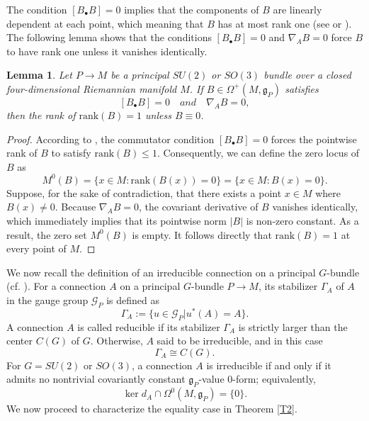 \documentclass[12pt, twoside]{article}
\newtheorem{lemma}[theorem]{Lemma}
\theoremstyle{definition}
\numberwithin{equation}{section}
\def\Om{\Omega}
\def\na {\nabla}
\def\Ga{\Gamma}
\begin{document}
The condition $[B_{\bullet}B]=0$ implies that the components of $B$ are linearly dependent at each point, 
which meaning that $B$ has at most rank one (see \cite[Lemma 3.5]{Hua24} or \cite[Lemma 1.6]{Tan17}). 
The following lemma shows that the conditions $[B_{\bullet}B]=0$ and $\na_{A}B=0$ force $B$ to have rank one unless it vanishes identically. 

\begin{lemma}\label{L4}
Let $P\rightarrow M$ be a principal $SU(2)$ or $SO(3)$ bundle over a closed four-dimensional Riemannian manifold $M$. If $B\in\Om^{+}(M,\mathfrak{g}_{P})$ satisfies
$$[B_{\bullet}B]=0\quad and\quad \na_{A}B=0,$$ 
then the rank of $\mathrm{rank}(B)=1$ unless $B\equiv0$.
\end{lemma}

\begin{proof}
According to \cite[Lemma 1.6]{Tan17}, the commutator condition $[B_{\bullet}B] = 0$ forces the pointwise rank of $B$ to satisfy $\mathrm{rank}(B) \leq 1$. Consequently, we can define the zero locus of $B$ as
\[M^{0}(B)=\{x\in M: \mathrm{rank}(B(x))=0\}=\{x\in M:B(x)=0 \}.\]
Suppose, for the sake of contradiction, that there exists a point $x \in M$ where $B(x) \neq 0$. Because $\nabla_{A} B = 0$, the covariant derivative of $B$ vanishes identically, which immediately implies that its pointwise norm $|B|$ is non-zero constant. As a result, the zero set $M^{0}(B)$ is empty. It follows directly that $\mathrm{rank}(B) = 1$ at every point of $M$.
\end{proof}
We now recall the definition of an irreducible connection on a principal $G$-bundle (cf. \cite{DK90,Hua19,Tan17}). For a connection $A$ on a principal $G$-bundle $P\rightarrow M$, its stabilizer $\Ga_{A}$ of $A$ in the gauge group  $\mathcal{G}_{P}$ is defined as
$$\Ga_{A}:=\{u\in\mathcal{G}_{P}|u^{\ast}(A)=A \}.$$
A connection $A$ is called reducible if its stabilizer $\Ga_{A}$ is strictly larger than the center $C(G)$ of $G$. Otherwise, $A$ said to be irreducible, and in this case
$$\Ga_{A}\cong C(G).$$
For $G=SU(2)$ or $SO(3)$, a connection $A$ is irreducible if and only if it admits no nontrivial covariantly constant $\mathfrak{g}_{P}$-value $0$-form; equivalently,
$$\ker d_{A}\cap \Om^{0}(M,\mathfrak{g}_{P})=\{0\}.$$
We now proceed to characterize the equality case in Theorem \ref{T2}.
\end{document}
